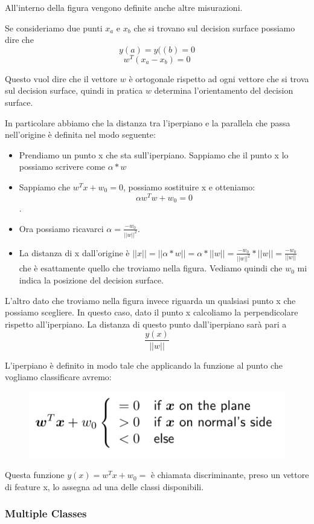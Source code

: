 \documentclass[14pt]{extreport}
\begin{document}
All'interno della figura vengono definite anche altre misurazioni.

Se consideriamo due punti $x_a$ e $x_b$ che si trovano sul decision surface possiamo dire che $$y(a) = y((b) = 0$$
$$w^T(x_a-x_b)=0$$

Questo vuol dire che il vettore $w$ è ortogonale rispetto ad ogni vettore che si trova sul decision surface, quindi in pratica $w$ determina
l'orientamento del decision surface.

In particolare abbiamo che la distanza tra l'iperpiano e la parallela che passa nell'origine è definita nel modo seguente:
\begin{itemize}
\item Prendiamo un punto x che sta sull'iperpiano. Sappiamo che il punto x lo possiamo scrivere come $\alpha * w$ 
\item Sappiamo che $w^Tx + w_0 = 0$, possiamo sostituire x e otteniamo: $$\alpha w^T w + w_0 = 0$$.
\item Ora possiamo ricavarci $\alpha = \frac{-w_0}{||w||^2}$.
\item La distanza di x dall'origine è $||x|| = ||\alpha * w|| = \alpha * ||w|| = \frac{-w_0}{||w||^2} * ||w|| = \frac{-w_0}{||w||}$ che è esattamente
quello che troviamo nella figura. Vediamo quindi che $w_0$ mi indica la posizione del decision surface.
\end{itemize}

L'altro dato che troviamo nella figura invece riguarda un qualsiasi punto x che possiamo scegliere. In questo caso, dato il punto x calcoliamo la
perpendicolare rispetto all'iperpiano. La distanza di questo punto dall'iperpiano sarà pari a $$\frac{y(x)}{||w||}$$


L'iperpiano è definito in modo tale che applicando la funzione al punto che vogliamo classificare avremo:
\begin{figure}[H]
\centering
\includegraphics[width=0.5\linewidth]{147.jpeg}
\end{figure}

Questa funzione $y(x) = w^Tx+w_0=$ è chiamata discriminante, preso un vettore di feature x, lo assegna ad una delle classi disponibili.

\subsubsection{Multiple Classes}
\end{document}
